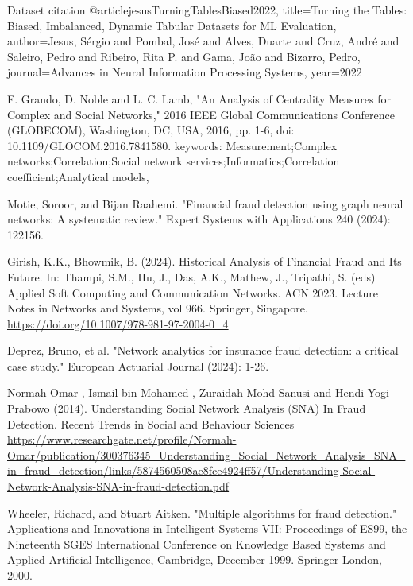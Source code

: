 \documentclass{styles/svproc}
\begin{document}
\newpage
%
%
\begin{thebibliography}{7}
%

Dataset citation
@article{jesusTurningTablesBiased2022,
  title={Turning the {{Tables}}: {{Biased}}, {{Imbalanced}}, {{Dynamic Tabular Datasets}} for {{ML Evaluation}}},
  author={Jesus, S{\'e}rgio and Pombal, Jos{\'e} and Alves, Duarte and Cruz, Andr{\'e} and Saleiro, Pedro and Ribeiro, Rita P. and Gama, Jo{\~a}o and Bizarro, Pedro},
  journal={Advances in Neural Information Processing Systems},
  year={2022}
}

F. Grando, D. Noble and L. C. Lamb, "An Analysis of Centrality Measures for Complex and Social Networks," 2016 IEEE Global Communications Conference (GLOBECOM), Washington, DC, USA, 2016, pp. 1-6, doi: 10.1109/GLOCOM.2016.7841580. keywords: {Measurement;Complex networks;Correlation;Social network services;Informatics;Correlation coefficient;Analytical models},

Motie, Soroor, and Bijan Raahemi. "Financial fraud detection using graph neural networks: A systematic review." Expert Systems with Applications 240 (2024): 122156.

Girish, K.K., Bhowmik, B. (2024). Historical Analysis of Financial Fraud and Its Future. In: Thampi, S.M., Hu, J., Das, A.K., Mathew, J., Tripathi, S. (eds) Applied Soft Computing and Communication Networks. ACN 2023. Lecture Notes in Networks and Systems, vol 966. Springer, Singapore. \url{https://doi.org/10.1007/978-981-97-2004-0_4}

Deprez, Bruno, et al. "Network analytics for insurance fraud detection: a critical case study." European Actuarial Journal (2024): 1-26.

Normah Omar , Ismail bin Mohamed , Zuraidah Mohd Sanusi and Hendi Yogi Prabowo (2014). Understanding Social Network Analysis (SNA) In Fraud Detection. Recent Trends in Social and Behaviour Sciences \url{https://www.researchgate.net/profile/Normah-Omar/publication/300376345_Understanding_Social_Network_Analysis_SNA_in_fraud_detection/links/5874560508ae8fce4924ff57/Understanding-Social-Network-Analysis-SNA-in-fraud-detection.pdf}

Wheeler, Richard, and Stuart Aitken. "Multiple algorithms for fraud detection." Applications and Innovations in Intelligent Systems VII: Proceedings of ES99, the Nineteenth SGES International Conference on Knowledge Based Systems and Applied Artificial Intelligence, Cambridge, December 1999. Springer London, 2000.

\end{thebibliography}
\end{document}

